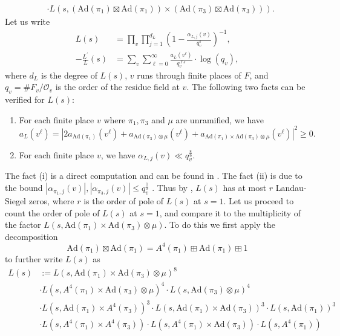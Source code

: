 \documentclass[12pt]{amsart}
\newcommand{\cO}{\mathcal{O}}
\newcommand{\Ad}{\text{Ad}}
\begin{document}
\begin{enumerate}
\begin{enumerate}
\begin{align*}
            &\cdot L(s,(\Ad(\pi_1) \boxtimes \Ad(\pi_1)) \times (\Ad(\pi_3) \boxtimes \Ad(\pi_3))).
        \end{align*}
        Let us write 
        \begin{align*}
            L(s) &= \prod_v\prod_{j=1}^{d_L} \left(1-\frac{\alpha_{L,j}(v)}{q_v^s}\right)^{-1}, \\
            -\frac{L^\prime}{L}(s) &= \sum_{v} \sum_{\ell=0}^\infty \frac{a_L(v^\ell)}{q_v^{\ell s}}\cdot\log (q_v),
        \end{align*}
        where $d_L$ is the degree of $L(s)$, $v$ runs through finite places of $F$, and $q_v = \#F_v/\cO_v$ is the order of the residue field at $v$. The following two facts can be verified for $L(s)$:
        \begin{enumerate}
            \item For each finite place $v$ where $\pi_1,\pi_3$ and $\mu$ are unramified, we have 
            $$a_L(v^\ell) = |2a_{\Ad(\pi_1)}(v^\ell) + a_{\Ad(\pi_3) \otimes \mu}(v^\ell) + a_{\Ad(\pi_1) \times \Ad(\pi_3) \otimes \mu}(v^\ell)|^2 \geq 0.$$ 
            \item For each finite place $v$, we have $\alpha_{L,j}(v) \ll q_v^{\frac{8}{9}}$.
        \end{enumerate}
        The fact (i) is a direct computation and can be found in \cite[Lemma 3.2]{Thorner2025symmetricsquare}. The fact (ii) is due to the bound $|\alpha_{\pi_1,j}(v)|,|\alpha_{\pi_3,j}(v)| \leq  q_v^{\frac{1}{9}}$ \cite[Proposition 4.8]{KimShahidi2002FourthPowerCuspidality}. Thus by \cite[Lemma 5.9]{IwaniecKowalskiANT}, $L(s)$ has at most $r$ Landau-Siegel zeros, where $r$ is the order of pole of $L(s)$ at $s=1$. Let us proceed to count the order of pole of $L(s)$ at $s=1$, and compare it to the multiplicity of the factor $L(s,\Ad(\pi_1) \times \Ad(\pi_3) \otimes \mu)$. To do this we first apply the decomposition
        $$\Ad(\pi_1) \boxtimes \Ad(\pi_1) = A^4(\pi_1) \boxplus \Ad(\pi_1) \boxplus 1$$
        to further write $L(s)$ as 
        \begin{align*}
            L(s) &:= L(s,\Ad(\pi_1) \times \Ad(\pi_3) \otimes \mu)^8 \\
            &\cdot L(s,A^4(\pi_1) \times \Ad(\pi_3) \otimes \mu)^4 \cdot L(s,\Ad(\pi_3) \otimes \mu)^4 \\
            &\cdot L(s,\Ad(\pi_1) \times A^4(\pi_3))^3 \cdot L(s,\Ad(\pi_1) \times \Ad(\pi_3))^3 \cdot L(s,\Ad(\pi_1))^3 \\
            &\cdot L(s,A^4(\pi_1) \times A^4(\pi_3)) \cdot L(s,A^4(\pi_1) \times \Ad(\pi_3)) \cdot L(s,A^4(\pi_1)) \\

\end{align*}
\end{enumerate}
\end{enumerate}
\end{document}
